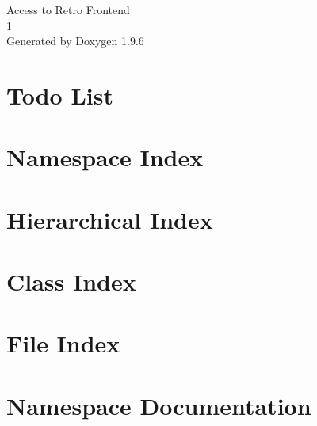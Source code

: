 \documentclass[twoside]{book}
\newcommand{\+}{\discretionary{\mbox{\scriptsize$\hookleftarrow$}}{}{}}
\newcommand{\clearemptydoublepage}{%
    \newpage{\pagestyle{empty}\cleardoublepage}%
  }
\begin{document}
  \raggedbottom
    \hypersetup{pageanchor=false,
                bookmarksnumbered=true,
                pdfencoding=unicode
               }
  \begin{titlepage}
  \vspace*{7cm}
  \begin{center}%
  {\Large Access to Retro Frontend}\\
  [1ex]\large 1 \\
  \vspace*{1cm}
  {\large Generated by Doxygen 1.9.6}\\
  \end{center}
  \end{titlepage}
  \clearemptydoublepage
  \tableofcontents
  \clearemptydoublepage
  \hypersetup{pageanchor=true}
\chapter{Todo List}
\label{todo}

\chapter{Namespace Index}

\chapter{Hierarchical Index}

\chapter{Class Index}

\chapter{File Index}

\chapter{Namespace Documentation}












\end{document}

